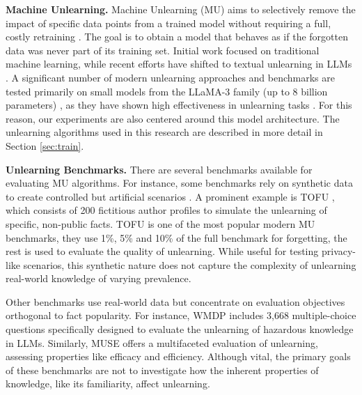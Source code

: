 \documentclass[sigconf,anonymous]{aamas}
\begin{document}
\textbf{Machine Unlearning.}
Machine Unlearning (MU) aims to selectively remove the impact of specific data points from a trained model without requiring a full, costly retraining \cite{mantelero2013eu, cao2015towards, sekhari2021remember}. The goal is to obtain a model that behaves as if the forgotten data was never part of its training set. Initial work focused on traditional machine learning, while recent efforts have shifted to textual unlearning in LLMs \cite{sekhari2021remember, kurmanji2023towards}.
A significant number of modern unlearning approaches and benchmarks are tested primarily on small models from the LLaMA-3 family (up to 8 billion parameters) \cite{yuan2025towards, maini2024tofu, wang2025selective, si2023knowledge}, as they have shown high effectiveness in unlearning tasks \cite{maini2024tofu, yuan2025towards}. For this reason, our experiments are also centered around this model architecture.
The unlearning algorithms used in this research are described in more detail in Section \ref{sec:train}.


\textbf{Unlearning Benchmarks.}
There are several benchmarks available for evaluating MU algorithms. For instance, some benchmarks rely on synthetic data to create controlled but artificial scenarios \cite{geng2025comprehensive, hu2024unlearning, si2023knowledge}. A prominent example is TOFU \cite{maini2024tofu}, which consists of 200 fictitious author profiles to simulate the unlearning of specific, non-public facts. TOFU is one of the most popular modern MU benchmarks, they use 1\%, 5\% and 10\% of the full benchmark for forgetting, the rest is used to evaluate the quality of unlearning. While useful for testing privacy-like scenarios, this synthetic nature does not capture the complexity of unlearning real-world knowledge of varying prevalence.

Other benchmarks use real-world data but concentrate on evaluation objectives orthogonal to fact popularity. For instance, WMDP \cite{li2024wmdp} includes 3,668 multiple-choice questions specifically designed to evaluate the unlearning of hazardous knowledge in LLMs. Similarly, MUSE \cite{shimuse} offers a multifaceted evaluation of unlearning, assessing properties like efficacy and efficiency. Although vital, the primary goals of these benchmarks are not to investigate how the inherent properties of knowledge, like its familiarity, affect unlearning.
\end{document}
